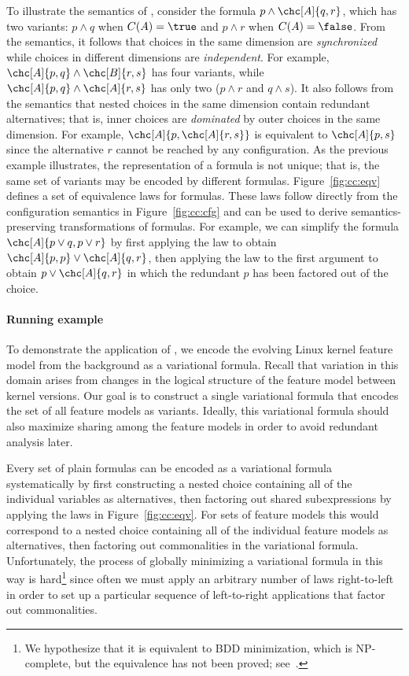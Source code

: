 To illustrate the semantics of \vpl{}, consider the formula
$p\wedge\chc[A]{q,r}$, which has two variants: $p\wedge q$ when $C(A)=\true$
and $p\wedge r$ when $C(A)=\false$.
%
From the semantics, it follows that choices in the same dimension are
\emph{synchronized} while choices in different dimensions are
\emph{independent}. For example, $\chc[A]{p,q}\wedge\chc[B]{r,s}$ has four
variants, while $\chc[A]{p,q}\wedge\chc[A]{r,s}$ has only two ($p\wedge r$ and
$q\wedge s$).
%
It also follows from the semantics that nested choices in the same dimension
contain redundant alternatives; that is, inner choices are \emph{dominated} by
outer choices in the same dimension. For example, $\chc[A]{p,\chc[A]{r,s}}$ is
equivalent to $\chc[A]{p,s}$ since the alternative $r$ cannot be reached by any
configuration.
%
As the previous example illustrates, the representation of a \vpl{} formula is
not unique; that is, the same set of variants may be encoded by different
formulas. Figure~\ref{fig:cc:eqv} defines a set of equivalence laws for
\vpl{} formulas. These laws follow directly from the configuration semantics in
Figure~\ref{fig:cc:cfg} and can be used to derive semantics-preserving
transformations of \vpl{} formulas.
%
For example, we can simplify the formula $\chc[A]{p\vee q, p\vee r}$ by first
applying the  law to obtain $\chc[A]{p,p}\vee\chc[A]{q,r}$, then applying
the  law to the first argument to obtain $p\vee\chc[A]{q,r}$ in which
the redundant $p$ has been factored out of the choice.
%
\paragraph{Running example}
To demonstrate the application of \vpl{}, we encode the evolving Linux kernel
feature model from the background as a variational formula. Recall that
variation in this domain arises from changes in the logical structure of the
feature model between kernel versions. Our goal is to construct a single
variational formula that encodes the set of all feature models as variants.
Ideally, this variational formula should also maximize sharing among the feature
models in order to avoid redundant analysis later.

Every set of plain formulas can be encoded as a variational formula
systematically by first constructing a nested choice containing all of the
individual variables as alternatives, then factoring out shared subexpressions
by applying the laws in Figure~\ref{fig:cc:eqv}. For sets of feature models this would
correspond to a nested choice containing all of the individual feature models as
alternatives, then factoring out commonalities in the variational formula.
%
Unfortunately, the process of globally minimizing a variational formula in this
way is hard\footnote{We hypothesize that it is equivalent to BDD minimization,
which is NP-complete, but the equivalence has not been proved;
see~\cite{Walk14onward}.} since often we must apply an arbitrary number of laws
right-to-left in order to set up a particular sequence of left-to-right
applications that factor out commonalities.

